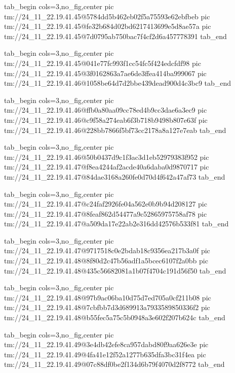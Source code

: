  
 
 
 
 

\qqSecCmtScr


\ifcmt
  tab_begin cols=3,no_fig,center
    pic tm://24_11_22.19.41.45@5784dd5b462eb02f5a75593e62ebfbeb
    pic tm://24_11_22.19.41.45@fe32b684d02bd6217413699e5d8ae57a
    pic tm://24_11_22.19.41.45@7d0795ab750bac7f4cf2d6a457778391
  tab_end
\fi


\ifcmt
  tab_begin cols=3,no_fig,center
    pic tm://24_11_22.19.41.45@041e77fc993f1cc54fc5f424edcfdf98
    pic tm://24_11_22.19.41.45@3f0162863a7ae6de3ffea414ba999067
    pic tm://24_11_22.19.41.46@1058be64d7d2bbe439dead900d4c3bc9
  tab_end
\fi


\ifcmt
  tab_begin cols=3,no_fig,center
    pic tm://24_11_22.19.41.46@ffb0a80aa09cc78ed4b9cc3dae6a3ec9
    pic tm://24_11_22.19.41.46@c9f58a274eab6f3b718b9498b807e63f
    pic tm://24_11_22.19.41.46@228bb7866f5bf73cc2178a8a127e7eab
  tab_end
\fi


\ifcmt
  tab_begin cols=3,no_fig,center
    pic tm://24_11_22.19.41.46@50b0437d9c1f3ac3d1eb52979383f952
    pic tm://24_11_22.19.41.47@f8ea4244af2acde40a6daba0d9870717
    pic tm://24_11_22.19.41.47@84dae3168a260fe0d70d4f642a47af73
  tab_end
\fi


\ifcmt
  tab_begin cols=3,no_fig,center
    pic tm://24_11_22.19.41.47@c24faf2926fe04a562e0b9b94d208127
    pic tm://24_11_22.19.41.47@8feaf862d54477a9c52865975758af78
    pic tm://24_11_22.19.41.47@a509da17e22ab2e316dd42576b533f81
  tab_end
\fi


\ifcmt
  tab_begin cols=3,no_fig,center
    pic tm://24_11_22.19.41.47@9717518c0e2bdab18c9356ea217b3a0f
    pic tm://24_11_22.19.41.48@8f80d2c47b56adf1a5bcec6107f2a0bb
    pic tm://24_11_22.19.41.48@435c56682081a1b07f4704c191d56f50
  tab_end
\fi


\ifcmt
  tab_begin cols=3,no_fig,center
    pic tm://24_11_22.19.41.48@97b9ac06ba10d75d7ed705a0cf211b08
    pic tm://24_11_22.19.41.48@7cbfbb7d3d689913a7933589850336f2
    pic tm://24_11_22.19.41.48@b55fec5a75c5b0948a3e602f207b624c
  tab_end
\fi


\ifcmt
  tab_begin cols=3,no_fig,center
    pic tm://24_11_22.19.41.49@3e4db42efe8ca957dabd80f9aa626e3e
    pic tm://24_11_22.19.41.49@4fa41e12f52a1277b635dfa3bc31f4ea
    pic tm://24_11_22.19.41.49@07c88df0be2f134d6b79f4070d2f8772
  tab_end
\fi


